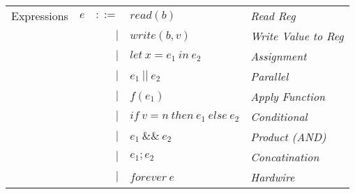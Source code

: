 \documentclass[12pt, letterpaper]{article}
\begin{document}
  \begin{tabular}{l c r l l}
    Expressions & $e$ & $::=$  & $read(b)$       
                      & \textit{Read Reg}\\
                &     & $\mid$ & $write(b,v)$    
                      & \textit{Write Value to Reg}\\
                &     & $\mid$ & $let\ x = e_1\ in\ e_2$ 
                      & \textit{Assignment}\\  
                &     & $\mid$ & $e_1\ ||\ e_2$ 
                      & \textit{Parallel}\\
                &     & $\mid$ & $f(e_1)$        
                      & \textit{Apply Function} \\  
                &     & $\mid$ & $if\ v = n\ then\ e_1\ else\ e_2$
                      & \textit{Conditional} \\
                &     & $\mid$ & $e_1\ \&\&\ e_2$ 
                      & \textit{Product (AND)}\\
                &     & $\mid$ & $e_1 ; e_2$
                      & \textit{Concatination}\\
                &     & $\mid$ & $forever\ e$ 
                      & \textit{Hardwire}
  \end{tabular}


\newpage
\end{document}
